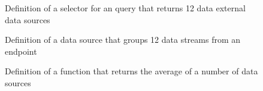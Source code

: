 \label{laguagedificulties}
\begin{figure}

\caption{Definition of a selector for an query that returns 12 data external data sources}
\end{figure}
\begin{figure}

\caption{Definition of a data source that groups 12 data streams from an endpoint}
\end{figure}
\begin{figure}

\caption{Definition of a function that returns the average of a number of data sources}
\end{figure}
